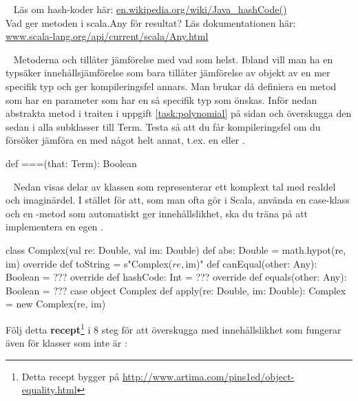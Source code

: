 \QUESTBEGIN

\Task  \what~ Läs om hash-koder här: \href{https://en.wikipedia.org/wiki/Java_hashCode()}{en.wikipedia.org/wiki/Java\_hashCode()} \\
Vad ger metoden \code{##} i scala.Any för resultat? Läs dokumentationen här: \\ \href{http://www.scala-lang.org/api/current/scala/Any.html}{www.scala-lang.org/api/current/scala/Any.html}

\SOLUTION


\TaskSolved \what



\QUESTEND







\QUESTBEGIN

\Task  \what~  Metoderna  och \code{==} tillåter jämförelse med vad som helst. Ibland vill man ha en typsäker innehållsjämförelse som bara tillåter jämförelse av objekt av en mer specifik typ och ger kompileringsfel annars. Man brukar då definiera en metod \code{===} som har en parameter  som har en så specifik typ som önskas. Inför nedan abstrakta metod \code{===} i traiten  i uppgift \ref{task:polynomial} på sidan \pageref{task:polynomial} och överskugga den sedan i alla subklasser till Term. Testa så att du får kompileringsfel om du försöker jämföra en  med något helt annat, t.ex. en  eller .
\begin{Code}
  def ===(that: Term): Boolean
\end{Code}


\SOLUTION


\TaskSolved \what



\QUESTEND







\QUESTBEGIN

\Task \label{task:equals:Complex} \what~   Nedan visas delar av klassen  som representerar ett komplext tal med realdel och imaginärdel. I stället för att, som man ofta gör i Scala, använda en case-klass och en -metod som automatiskt ger innehållslikhet, ska du träna på att implementera en egen .
\begin{Code}
class Complex(val re: Double, val im: Double) {
  def abs: Double = math.hypot(re, im)
  override def toString = s"Complex($re, $im)"
  def canEqual(other: Any): Boolean = ???
  override def hashCode: Int  = ???
  override def equals(other: Any): Boolean = ???
}
case object Complex {
  def apply(re: Double, im: Double): Complex = new Complex(re, im)
}
\end{Code}
Följ detta \textbf{recept}\footnote{Detta recept bygger på \url{http://www.artima.com/pins1ed/object-equality.html}} i 8 steg för att överskugga  med innehållslikhet som fungerar även för klasser som inte är :

